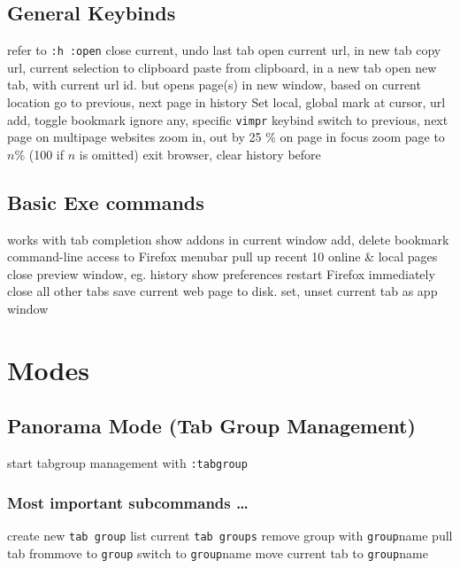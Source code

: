 \subsection{General Keybinds}	{refer to {\tt :h :open}}
	{close current, undo last tab}
	{open current url, in new tab}
	{copy url, current selection to clipboard}
	{paste from clipboard, in a new tab}
	{open new tab, with current url}
	{id. but opens page(s) in new window, based on current location}
	{go to previous, next page in history}
	{Set local, global mark at cursor, url}
	{add, toggle bookmark}
	{ignore any, specific {\tt vimpr} keybind}
\cmdS{\lbracket\lbracket~\rbracket\rbracket}	{switch to previous, next page on multipage websites}
\cmdS{+~-}	{zoom in, out by 25 \% on page in focus}
	{zoom page to $n$\% (100 if $n$ is omitted)}
	{exit browser, clear history before}

\subsection{Basic Exe commands}{works with tab completion}
	{show addons in current window}
	{add, delete bookmark}
	{command-line access to Firefox menubar}
	{pull up recent 10 online \& local pages}
	{close preview window, eg. history}
	{show preferences}
	{restart Firefox immediately}
	{close all other tabs}
	{save current web page to disk.}
	{set, unset current tab as app window}

\section{Modes}{}
\subsection{Panorama Mode (Tab Group Management)}{start tabgroup management with {\tt :tabgroup }}
\subsubsection{Most important subcommands \ldots}{}
	{create new {\tt tab group}}
	{list current {\tt tab groups}}
	{remove group with {\tt group}name}
	{pull tab from\or move to {\tt group}}
	{switch to {\tt group}name}
	{move current tab to {\tt group}name}


